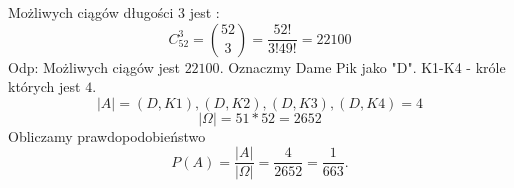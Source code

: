 \medskip
{}
\medskip
 
Możliwych ciągów długości 3 jest :
$$
C^{3}_{52} = {52\choose 3} = \frac{52!}{3!49!} = 22100
$$
Odp: Możliwych ciągów jest $22100$.
Oznaczmy Dame Pik jako "D".
K1-K4 - króle których jest $4$.
$$
|A|= {(D,K1),(D,K2),(D,K3),(D,K4)} = 4
$$
$$
|\Omega|=51*52 = 2652
$$
Obliczamy prawdopodobieństwo
$$
P(A)=\frac{|A|}{|\Omega|}=\frac{4}{2652}=\frac{1}{663}.
$$
